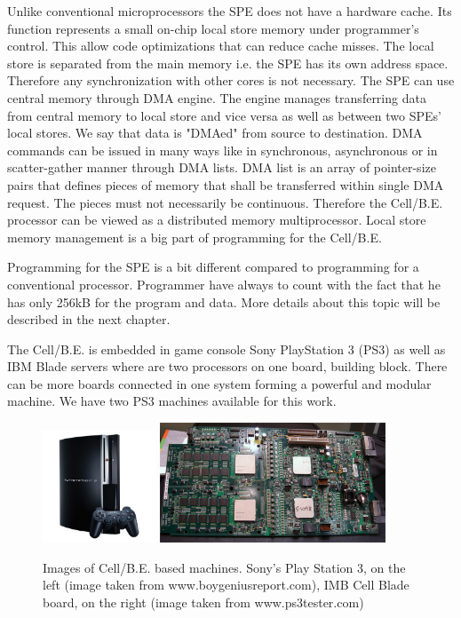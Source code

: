 \par
Unlike conventional microprocessors the SPE does not have a hardware cache.
Its function represents a small on-chip local store memory under programmer's control.
This allow code optimizations that can reduce cache misses.
The local store is separated from the main memory i.e. the SPE has its own address space.
Therefore any synchronization with other cores is not necessary.
The SPE can use central memory through DMA engine.
The engine manages transferring data from central memory to local store and vice versa as well as between two SPEs' local stores.
We say that data is "DMAed" from source to destination.
DMA commands can be issued in many ways like in synchronous, asynchronous or in scatter-gather manner through DMA lists.
DMA list is an array of pointer-size pairs that defines pieces of memory that shall be transferred within single DMA request.
The pieces must not necessarily be continuous.
Therefore the \mbox{Cell/B.E.} processor can be viewed as a distributed memory multiprocessor.
Local store memory management is a big part of programming for the \mbox{Cell/B.E.}

\par
Programming for the SPE is a bit different compared to programming for a conventional processor.
Programmer have always to count with the fact that he has only 256kB for the program and data.
More details about this topic will be described in the next chapter.

\par
The \mbox{Cell/B.E.} is embedded in game console Sony PlayStation 3 (PS3) as well as IBM Blade servers where are two processors on one board, building block.
There can be more boards connected in one system forming a powerful and modular machine.
We have two PS3 machines available for this work.

\begin{figure}
    \centering
    \includegraphics[width=0.3\textwidth]{data/png/PS3}
    \includegraphics[width=0.6\textwidth]{data/png/ibm-cell-board}
    \caption[\mbox{Cell/B.E.} based machines]{Images of \mbox{Cell/B.E.} based machines.
Sony's Play Station 3, on the left (image taken from www.boygeniusreport.com), IMB Cell Blade board, on the right (image taken from www.ps3tester.com)
}
    \label{fg:cellmachines}
\end{figure}

